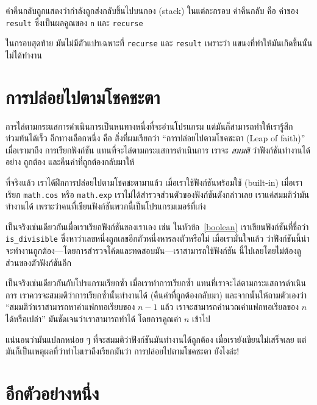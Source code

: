 ค่าคืนกลับถูกแสดงว่ากำลังถูกส่งกลับขึ้นไปบนกอง (stack) ในแต่ละกรอบ ค่าคืนกลับ
คือ ค่าของ {\tt result} ซึ่งเป็นผลคูณของ {\tt n} และ {\tt recurse}

ในกรอบสุดท้าย มันไม่มีตัวแปรเฉพาะที่ {\tt recurse} และ {\tt result} เพราะว่า
แขนงที่ทำให้มันเกิดขึ้นนั้นไม่ได้ทำงาน


\section{การปล่อยไปตามโชคชะตา } %

การไล่ตามกระแสการดำเนินการเป็นหนทางหนึ่งที่จะอ่านโปรแกรม แต่มันก็สามารถทำให้เรารู้สึกท่วมท้นได้เร็ว
อีกทางเลือกหนึ่ง คือ สิ่งที่ผมเรียกว่า ``การปล่อยไปตามโชคชะตา (Leap of faith)'' เมื่อเรามาถึง
การเรียกฟังก์ชัน แทนที่จะไล่ตามกระแสการดำเนินการ เราจะ {\em สมมติ} ว่าฟังก์ชันทำงานได้อย่าง
ถูกต้อง และคืนค่าที่ถูกต้องกลับมาให้

ที่จริงแล้ว เราได้ฝึกการปล่อยไปตามโชคชะตามาแล้ว เมื่อเราใช้ฟังก์ชันพร้อมใช้ (built-in)
เมื่อเราเรียก {\tt math.cos} หรือ {\tt math.exp} เราไม่ได้สำรวจส่วนตัวของฟังก์ชันดังกล่าวเลย
เราแค่สมมติว่ามันทำงานได้ เพราะว่าคนที่เขียนฟังก์ชันพวกนี้เป็นโปรแกรมเมอร์ที่เก่ง

เป็นจริงเช่นเดียวกันเมื่อเราเรียกฟังก์ชันของเราเอง เช่น ในหัวข้อ~\ref{boolean} เราเขียนฟังก์ชันที่ชื่อว่า
\verb"is_divisible" ซึ่งหาว่าเลขหนึ่งถูกเลขอีกตัวหนึ่งหารลงตัวหรือไม่ เมื่อเรามั่นใจแล้ว
ว่าฟังก์ชันนี้น่าจะทำงานถูกต้อง---โดยการสำรวจโค้ดและทดสอบมัน---เราสามารถใช้ฟังก์ชัน
นี้ไปเลยโดยไม่ต้องดูส่วนของตัวฟังก์ชันอีก

เป็นจริงเช่นเดียวกันกับโปรแกรมเรียกซ้ำ เมื่อเราทำการเรียกซ้ำ แทนที่เราจะไล่ตามกระแสการดำเนินการ
เราควรจะสมมติว่าการเรียกซ้ำนั้นทำงานได้ (คืนค่าที่ถูกต้องกลับมา) และจากนั้นให้ถามตัวเองว่า
``สมมติว่าเราสามารถหาค่าแฟกทอเรียบของ $n-1$ แล้ว เราจะสามารถคำนวณค่าแฟกทอเรียลของ $n$
ได้หรือเปล่า'' มันชัดเจนว่าเราสามารถทำได้ โดยการคูณค่า $n$ เข้าไป

แน่นอนว่ามันแปลกหน่อย ๆ ที่จะสมมติว่าฟังก์ชันมันทำงานได้ถูกต้อง เมื่อเรายังเขียนไม่เสร็จเลย
แต่มันก็เป็นเหตุผลที่ว่าทำไมเราถึงเรียกมันว่า การปล่อยไปตามโชคชะตา ยังไงล่ะ!


\section{อีกตัวอย่างหนึ่ง} %
\label{one.more.example}

